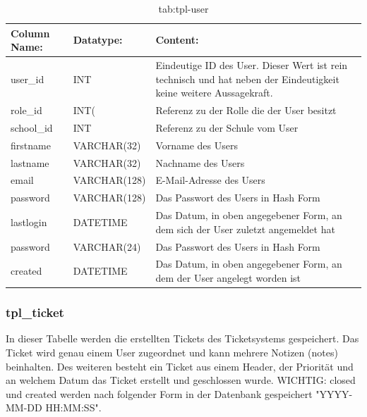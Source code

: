 \begin{table}[h]
	\begin{tabular}{|p{3.5cm}|p{4cm}|p{6.2cm}|}
		\hline
		\textbf{Column Name:} & \textbf{Datatype:} & \textbf{Content:}\\
		\hline
		user\_id & INT & Eindeutige ID des User. Dieser Wert ist rein technisch und hat  neben der Eindeutigkeit keine weitere Aussagekraft.\\
		\hline
		role\_id & INT( & Referenz zu der Rolle die der User besitzt\\
		\hline
		school\_id & INT &  Referenz zu der Schule vom User \\
		\hline
		firstname & VARCHAR(32) & Vorname des Users\\
		\hline
		lastname & VARCHAR(32) & Nachname des Users\\
		\hline
		email & VARCHAR(128) & E-Mail-Adresse des Users\\
		\hline
		password & VARCHAR(128) & Das Passwort des Users in Hash Form \\
		\hline
		lastlogin & DATETIME & Das Datum, in oben angegebener Form, an dem sich der User zuletzt angemeldet hat \\
		\hline
		password & VARCHAR(24) & Das Passwort des Users in Hash Form \\
		\hline
		created & DATETIME & Das Datum, in oben angegebener Form, an dem der User angelegt worden ist\\
		\hline
	\end{tabular}
	\caption{tab:tpl-user}
\end{table}
\label{tab:tpl_user}

\newpage

\subsubsection{tpl\_ticket}

In dieser Tabelle werden die erstellten Tickets des Ticketsystems gespeichert. Das Ticket wird genau einem User zugeordnet und kann mehrere Notizen (notes) beinhalten. Des weiteren besteht ein Ticket aus einem Header, der Priorität und an welchem Datum das Ticket erstellt und geschlossen wurde.
WICHTIG: closed und created werden nach folgender Form in der Datenbank gespeichert "YYYY-MM-DD HH:MM:SS".

